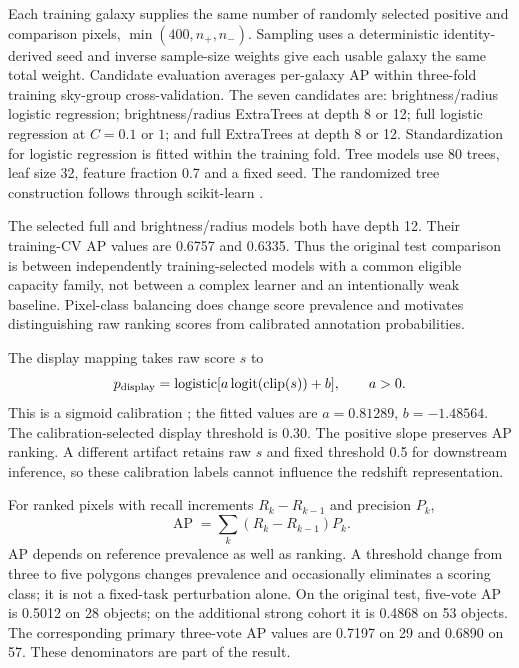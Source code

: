 \documentclass[10pt]{article}
\begin{document}
Each training galaxy supplies the same number of randomly selected positive
and comparison pixels, $\min(400,n_+,n_-)$. Sampling uses a deterministic
identity-derived seed and inverse sample-size weights give each usable galaxy
the same total weight. Candidate evaluation averages per-galaxy AP within
three-fold training sky-group cross-validation. The seven candidates are:
brightness/radius logistic regression; brightness/radius ExtraTrees at depth
8 or 12; full logistic regression at $C=0.1$ or $1$; and full ExtraTrees at
depth 8 or 12. Standardization for logistic regression is fitted within the
training fold. Tree models use 80 trees, leaf size 32, feature fraction 0.7
and a fixed seed. The randomized tree construction follows
\citet{geurts2006} through scikit-learn \citep{pedregosa2011}.

The selected full and brightness/radius models both have depth 12. Their
training-CV AP values are 0.6757 and 0.6335. Thus the original test comparison
is between independently training-selected models with a common eligible
capacity family, not between a complex learner and an intentionally weak
baseline. Pixel-class balancing does change score prevalence and motivates
distinguishing raw ranking scores from calibrated annotation probabilities.

The display mapping takes raw score $s$ to
\begin{equation}
 p_{\rm display}=\operatorname{logistic}
 [a\operatorname{logit}(\operatorname{clip}(s))+b],\qquad a>0.
\end{equation}
This is a sigmoid calibration \citep{platt1999}; the fitted values are
$a=0.81289$, $b=-1.48564$. The calibration-selected display threshold is 0.30.
The positive slope preserves AP ranking. A different artifact retains raw
$s$ and fixed threshold 0.5 for downstream inference, so these calibration
labels cannot influence the redshift representation.

For ranked pixels with recall increments $R_k-R_{k-1}$ and precision $P_k$,
\begin{equation}
 \operatorname{AP}=\sum_k(R_k-R_{k-1})P_k.
\end{equation}
AP depends on reference prevalence as well as ranking. A threshold change
from three to five polygons changes prevalence and occasionally eliminates
a scoring class; it is not a fixed-task perturbation alone. On the original
test, five-vote AP is 0.5012 on 28 objects; on the additional strong cohort it
is 0.4868 on 53 objects. The corresponding primary three-vote AP values are
0.7197 on 29 and 0.6890 on 57. These denominators are part of the result.
\end{document}
